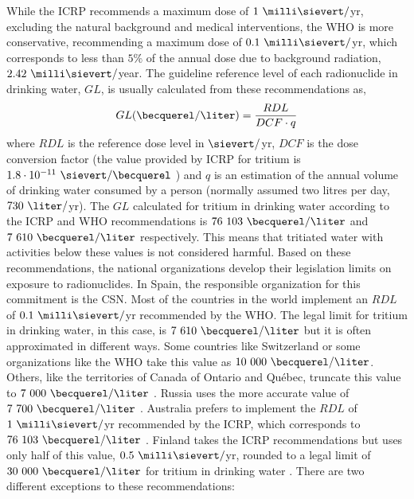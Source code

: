 While the ICRP recommends a maximum dose of $1~\milli\sievert/$yr, excluding the natural background and medical interventions, the WHO is more conservative, recommending a maximum dose of $0.1~\milli\sievert/$yr, which corresponds to less than $5\%$ of the annual dose due to background radiation, $2.42~\milli\sievert/$year. The guideline reference level of each radionuclide in drinking water, $GL$, is usually calculated from these recommendations as,
\begin{equation}
GL (\becquerel/\liter) = \frac{RDL}{DCF \cdot{} q}
\label{eq:Guideline}
\end{equation}
where $RDL$ is the reference dose level in $\sievert/$yr, $DCF$ is the dose conversion factor (the value provided by ICRP for tritium is $1.8 \cdot{} 10^{-11}~\sievert/ \becquerel$ \cite{ICRP_factor}) and $q$ is an estimation of the annual volume of drinking water consumed by a person (normally assumed two litres per day, $730~\liter/$yr). The $GL$ calculated for tritium in drinking water according to the ICRP and WHO recommendations is $76~103~\becquerel/\liter$ and $7~610~\becquerel/\liter$  respectively. This means that tritiated water with activities below these values is not considered harmful. Based on these recommendations, the national organizations develop their legislation limits on exposure to radionuclides. In Spain, the responsible organization for this commitment is the CSN. Most of the countries in the world implement an $RDL$ of $0.1~\milli\sievert/$yr recommended by the WHO. The legal limit for tritium in drinking water, in this case, is $7~610~\becquerel/\liter$  but it is often approximated in different ways. Some countries like Switzerland \cite{Switzerland_GL} or some organizations like the WHO \cite{WHO_GL} take this value as $10~000~\becquerel/\liter$. Others, like the territories of Canada of Ontario and Québec, truncate this value to $7~000~\becquerel/\liter$ \cite{Ontario_GL, Quebec_GL}. Russia uses the more accurate value of $7~700~\becquerel/\liter$ \cite{Russia_GL}. Australia prefers to implement the $RDL$ of $1~\milli\sievert/$yr recommended by the ICRP, which corresponds to $76~103~\becquerel/\liter$ \cite{Australia_GL}. Finland takes the ICRP recommendations but uses only half of this value, $0.5~\milli\sievert/$yr, rounded to a legal limit of $30~000~\becquerel/\liter$ for tritium in drinking water \cite{Finland_GL}. There are two different exceptions to these recommendations:
